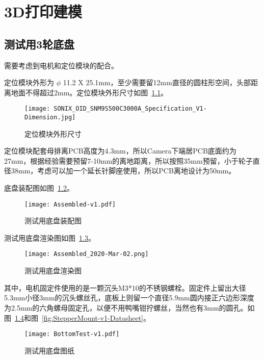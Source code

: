\chapter{3D打印建模}
\label{cha:Model}

\section{测试用3轮底盘}

需要考虑到电机和定位模块的配合。

定位模块外形为 $\phi$ 11.2 X 25.1mm，至少需要留12mm直径的圆柱形空间，头部距离地面不得超过2mm。定位模块外形尺寸如图~\ref{fig:Camera-Dimension}。

\begin{figure}[htbp]
    \centering
    \texttt{[image: SONIX\_OID\_SNM9S500C3000A\_Specification\_V1-Dimension.jpg]}
    \caption{定位模块外形尺寸}
    \label{fig:Camera-Dimension}
\end{figure}

定位模块配套母排离PCB高度为4.3mm，所以Camera下端居PCB底面约为27mm，根据经验需要预留7-10mm的离地距离，所以按照35mm预留，小于轮子直径38mm，考虑可以加一个延长针脚座使用，所以PCB离地设计为50mm。


底盘装配图如图~\ref{fig:Assembled-Test-Datasheet}。

\begin{figure}[htbp]
    \centering
    \texttt{[image: Assembled-v1.pdf]}
    \caption{测试用底盘装配图}
    \label{fig:Assembled-Test-Datasheet}
\end{figure}

测试用底盘渲染图如图~\ref{fig:Assembled-Test-Render}。

\begin{figure}[htbp]
    \centering
    \texttt{[image: Assembled\_2020-Mar-02.png]}
    \caption{测试用底盘渲染图}
    \label{fig:Assembled-Test-Render}
\end{figure}

其中，电机固定件使用的是一颗沉头M3*10的不锈钢螺栓。固定件上留出大径5.3mm小径3mm的沉头螺丝孔，底板上则留一个直径5.9mm圆内接正六边形深度为2.5mm的六角螺母固定孔，以便不用鸭嘴钳拧螺丝，当然也有3mm的圆孔。如图~\ref{fig:BottomTest-v1-Datasheet}和图~\ref{fig:StepperMount-v1-Datasheet}。

\begin{figure}[htbp]
    \centering
    \texttt{[image: BottomTest-v1.pdf]}
    \caption{测试用底盘图纸}
    \label{fig:BottomTest-v1-Datasheet}
\end{figure}

